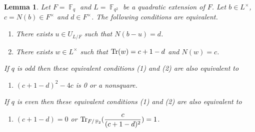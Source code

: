 \documentclass[11pt, a4paper]{amsart}
\newtheorem{lem}[thm]{Lemma}
\theoremstyle{definition}
\DeclareMathOperator{\F}{\mathbb{F}}
\numberwithin{equation}{section}
\begin{document}
\begin{lem} 
\label{lem:N(b-u)=d}
 Let $F=\F_q$ and  $L=\F_{q^2}$ be a quadratic extension of $F$. Let $b\in L^\times$, $c=N(b)\in F^\times$ and  $d\in F^\times$. The following conditions are equivalent.
 \begin{enumerate}
     \item There exists $u\in U_{L/F}$ such that $N(b-u)=d$.
     \item There exists $w\in L^\times$ such that ${\rm Tr}(w)=c+1-d$ and $N(w)=c$.
 \end{enumerate} If  $q$ is odd then these equivalent conditions (1) and (2) are also equivalent to 
 \begin{enumerate}
     \item[(3)] $(c+1-d)^2-4c$ is  0 or a nonsquare.
 \end{enumerate}
If  $q$ is even then these equivalent conditions (1) and (2) are also equivalent to 
 \begin{enumerate}
     \item[(4)] $(c+1-d)=0$ or ${\rm Tr}_{F/\F_2}(\dfrac{c}{(c+1-d)^2})=1$.
 \end{enumerate}
\end{lem}
\end{document}
